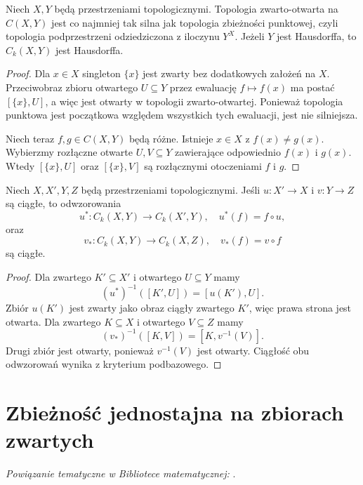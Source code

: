 \begin{stwierdzenie}
\label{prop:topog-odwzorowania-oddzielanie}
Niech $X,Y$ będą przestrzeniami topologicznymi.
Topologia zwarto-otwarta na $C(X,Y)$
jest co najmniej tak silna jak topologia
zbieżności punktowej, czyli topologia
podprzestrzeni odziedziczona z iloczynu $Y^X$.
Jeżeli $Y$ jest Hausdorffa,
to $C_k(X,Y)$ jest Hausdorffa.
\end{stwierdzenie}
\begin{proof}
Dla $x\in X$ singleton $\{x\}$ jest
zwarty bez dodatkowych założeń na $X$.
Przeciwobraz zbioru otwartego
$U\subseteq Y$ przez ewaluację
$f\mapsto f(x)$ ma postać
$[\{x\},U]$, a więc jest otwarty
w topologii zwarto-otwartej.
Ponieważ topologia punktowa
jest początkowa względem wszystkich
tych ewaluacji, jest nie silniejsza.

Niech teraz $f,g\in C(X,Y)$ będą różne.
Istnieje $x\in X$ z $f(x)\ne g(x)$.
Wybierzmy rozłączne otwarte
$U,V\subseteq Y$ zawierające
odpowiednio $f(x)$ i $g(x)$.
Wtedy $[\{x\},U]$ oraz $[\{x\},V]$
są rozłącznymi otoczeniami $f$ i $g$.
\end{proof}

\begin{stwierdzenie}
\label{prop:topog-odwzorowania-skladanie}
Niech $X,X',Y,Z$ będą przestrzeniami
topologicznymi.
Jeśli $u\colon X'\to X$ i
$v\colon Y\to Z$ są ciągłe, to
odwzorowania
\[
u^\ast\colon C_k(X,Y)\to C_k(X',Y),
\quad u^\ast(f)=f\circ u,
\]
oraz
\[
v_\ast\colon C_k(X,Y)\to C_k(X,Z),
\quad v_\ast(f)=v\circ f
\]
są ciągłe.
\end{stwierdzenie}
\begin{proof}
Dla zwartego $K'\subseteq X'$
i otwartego $U\subseteq Y$ mamy
\[
(u^\ast)^{-1}([K',U])=[u(K'),U].
\]
Zbiór $u(K')$ jest zwarty
jako obraz ciągły zwartego $K'$,
więc prawa strona jest otwarta.
Dla zwartego $K\subseteq X$
i otwartego $V\subseteq Z$ mamy
\[
(v_\ast)^{-1}([K,V])
=[K,v^{-1}(V)].
\]
Drugi zbiór jest otwarty,
ponieważ $v^{-1}(V)$ jest otwarty.
Ciągłość obu odwzorowań wynika
z kryterium podbazowego.
\end{proof}

\section{Zbieżność jednostajna na zbiorach zwartych}
\label{sec:topog-odwzorowania-jednostajna-zwarte}

\noindent\emph{Powiązanie tematyczne w Bibliotece matematycznej:} .


